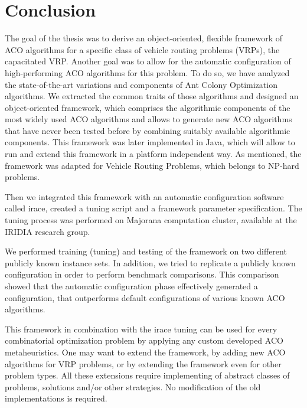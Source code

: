 \documentclass[12pt,a4paper,oneside]{book}
\begin{document}
\chapter{Conclusion}

The goal of the thesis was to derive an object-oriented, flexible framework of ACO algorithms for a specific class of vehicle routing problems (VRPs), the capacitated VRP. Another goal was to allow for the automatic configuration of high-performing ACO algorithms for this problem. To do so, we have analyzed the state-of-the-art variations and components of Ant Colony Optimization algorithms. We extracted the common traits of those algorithms and designed an object-oriented framework, which comprises the algorithmic components of the most widely used ACO algorithms and allows to generate new ACO algorithms that have never been tested before by combining suitably available algorithmic components. This framework was later implemented in Java, which will allow to run and extend this framework in a platform independent way. As mentioned, the framework was adapted for Vehicle Routing Problems, which belongs to NP-hard problems.

Then we integrated this framework with an automatic configuration  software called irace, created a tuning script and a framework parameter specification. The tuning process was performed on Majorana computation cluster, available at the IRIDIA research group.

We performed training (tuning) and testing of the framework on two different publicly known instance sets. In addition, we tried to replicate a publicly known configuration in order to perform benchmark comparisons. This comparison showed that the automatic configuration phase effectively generated a configuration, that outperforms default configurations of various known ACO algorithms.

This framework in combination with the irace tuning can be used for every combinatorial optimization problem by applying any custom developed ACO metaheuristics. One may want to extend the framework, by adding new ACO algorithms for VRP problems, or by extending the framework even for other problem types. All these extensions require implementing of abstract classes of problems, solutions and/or other strategies. No modification of the old implementations is required.


\appendix

\backmatter

\printindex %
\end{document}
